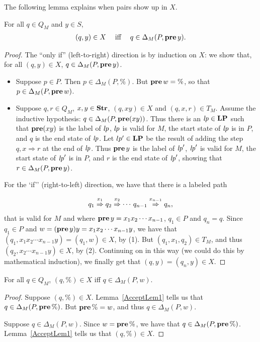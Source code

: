 The following lemma explains when pairs show up in $X$.

\begin{lemma}
\label{AcceptLem1}
For all $q\in Q_M$ and $y\in S$,
\begin{gather*}
(q,y)\in X\quad\;\allowbreak\mbox{iff}\allowbreak\;\quad q\in\Delta_M(P,\mathbf{pre}\,y) .
\end{gather*}
\end{lemma}

\begin{proof}
The ``only if'' (left-to-right) direction is by induction on $X$:
we show that, for all $(q,y)\in X$, $q\in\Delta_M(P,\mathbf{pre}\,y)$.
\begin{itemize}
\item Suppose $p\in P$.  Then $p\in\Delta_M(P,\%)$.  But
$\mathbf{pre}\,w=\%$, so that $p\in\Delta_M(P,\mathbf{pre}\,w)$.

\item Suppose $q,r\in Q_M$, $x,y\in\mathbf{Str}$, $(q,xy)\in X$ and
$(q,x,r)\in T_M$.  Assume the inductive hypothesis:
$q\in\Delta_M(P,\mathbf{pre}(xy))$.
Thus there is an ${\it lp}\in\mathbf{LP}$
such that $\mathbf{pre}(xy)$ is the label of ${\it lp}$, ${\it lp}$ is valid for $M$,
the start state of ${\it lp}$ is in $P$, and $q$ is the end state of ${\it lp}$.
Let $lp'\in\mathbf{LP}$ be the result of adding the step $q,x\Rightarrow r$ at
the end of ${\it lp}$.  Thus $\mathbf{pre}\,y$ is the label of ${\it lp}'$, ${\it lp}'$ is
valid for $M$, the start state of ${\it lp}'$ is in $P$, and $r$ is the end
state of ${\it lp}'$, showing that $r\in\Delta_M(P,\mathbf{pre}\,y)$.
\end{itemize}

For the `if'' (right-to-left) direction, we have that there is a
labeled path
\begin{gather*}
q_1\stackrel{\strut x_1}{\Rightarrow}q_2\stackrel{\strut x_2}{\Rightarrow}\cdots\,q_{n-1}\stackrel{\strut x_{n-1}}{\Rightarrow}q_n ,
\end{gather*}
that is valid for $M$ and where $\mathbf{pre}\,y=x_1x_2\cdots x_{n-1}$,
$q_1\in P$ and $q_n=q$.  Since $q_1\in P$ and
$w=(\mathbf{pre}\,y)y=x_1x_2\cdots x_{n-1}y$, we have that
$(q_1, x_1x_2\cdots x_{n-1}y)=(q_1,w)\in X$, by (1).  But
$(q_1,x_1,q_2)\in T_M$, and thus $(q_2, x_2\cdots x_{n-1}y)\in X$,
by (2). Continuing on in this way (we could do this by mathematical
induction), we finally get that $(q,y)=(q_n,y)\in X$.
\end{proof}

\begin{lemma}
\label{AcceptLem2}
For all $q\in Q_M$, $(q,\%)\in X$ iff $q\in\Delta_M(P,w)$.
\end{lemma}

\begin{proof}
Suppose $(q,\%)\in X$.  Lemma~\ref{AcceptLem1} tells us that
$q\in\Delta_M(P,\mathbf{pre}\,\%)$.  But $\mathbf{pre}\,\%=w$, and thus
$q\in\Delta_M(P,w)$.

Suppose $q\in\Delta_M(P,w)$.  Since $w=\mathbf{pre}\,\%$, we have that
$q\in\Delta_M(P,\mathbf{pre}\,\%)$.  Lemma~\ref{AcceptLem1} tells us that
$(q,\%)\in X$.
\end{proof}

